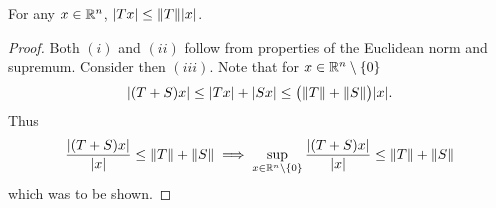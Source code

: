 \documentclass[../main.tex]{subfiles}
\begin{document}
\begin{corollary}
    For any $x \in \mathbb{R}^n$, $|Tx| \leq \norm{T} |x|$.
\end{corollary}


\begin{proof}
    Both $(i)$ and $(ii)$ follow from properties of the Euclidean norm and supremum. Consider then $(iii)$. Note that for $x \in \mathbb{R}^n \setminus \qty{0}$
    \[
        |(T+S)x| \leq |Tx| + |Sx| \leq \bigl(\norm{T} + \norm{S}\bigr) |x|
    .\]
    Thus
    \[
        \frac{|(T+S)x|}{|x|} \leq \norm{T} + \norm{S} \implies \sup_{x \in \mathbb{R}^n \setminus \qty{0}} \frac{|(T+S)x|}{|x|} \leq \norm{T} + \norm{S}
    \]
    which was to be shown.
\end{proof}
\end{document}
